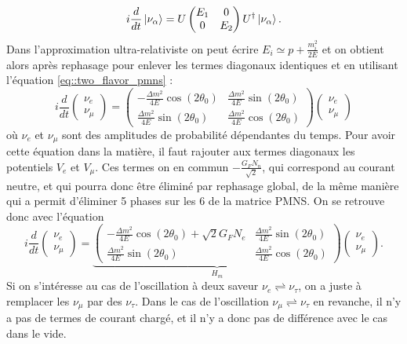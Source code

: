             \begin{equation}\label{eq::evolution_matter_2flavor}
                i\frac{d}{dt}\ket{\nu_{\alpha}} = U\left(\begin{matrix}E_1 & 0 \\ 0 & E_2\end{matrix}\right)U^{\dagger}\ket{\nu_{\alpha}}.
            \end{equation}
            Dans l'approximation ultra-relativiste on peut écrire $E_i \simeq p+ \frac{m_i^2}{2E}$ et on obtient alors après rephasage pour enlever les termes diagonaux identiques et en utilisant l'équation \eqref{eq::two_flavor_pmns} :
            \begin{equation}
                i\frac{d}{dt}\left(\begin{matrix}\nu_e \\ \nu_{\mu}\end{matrix}\right) = \left(\begin{matrix}-\frac{\Delta m^2}{4E}\cos(2\theta_0) & \frac{\Delta m^2}{4E}\sin(2\theta_0) \\ \frac{\Delta m^2}{4E}\sin(2\theta_0) & \frac{\Delta m^2}{4E}\cos(2\theta_0)\end{matrix}\right)\left(\begin{matrix}\nu_e \\ \nu_{\mu}\end{matrix}\right)
            \end{equation}
            où $\nu_e$ et $\nu_{\mu}$ sont des amplitudes de probabilité dépendantes du temps. Pour avoir cette équation dans la matière, il faut rajouter aux termes diagonaux les potentiels $V_e$ et $V_{\mu}$. Ces termes on en commun $-\frac{G_F N_n}{\sqrt{2}}$, qui correspond au courant neutre, et qui pourra donc être éliminé par rephasage global, de la même manière qui a permit d'éliminer 5 phases sur les 6 de la matrice PMNS. On se retrouve donc avec l'équation
            \begin{equation}\label{eq::hamiltonian_matter_2flavor}
                i\frac{d}{dt}\left(\begin{matrix}\nu_e \\ \nu_{\mu}\end{matrix}\right) = \underbrace{\left(\begin{matrix}-\frac{\Delta m^2}{4E}\cos(2\theta_0)+\sqrt{2}G_F N_e & \frac{\Delta m^2}{4E}\sin(2\theta_0) \\ \frac{\Delta m^2}{4E}\sin(2\theta_0) & \frac{\Delta m^2}{4E}\cos(2\theta_0)\end{matrix}\right)}_{H_m}\left(\begin{matrix}\nu_e \\ \nu_{\mu}\end{matrix}\right).
            \end{equation}
            Si on s'intéresse au cas de l'oscillation à deux saveur $\nu_e\rightleftharpoons\nu_{\tau}$, on a juste à remplacer les $\nu_{\mu}$ par des $\nu_{\tau}$. Dans le cas de l'oscillation $\nu_{\mu}\rightleftharpoons\nu_{\tau}$ en revanche, il n'y a pas de termes de courant chargé, et il n'y a donc pas de différence avec le cas dans le vide.
            
